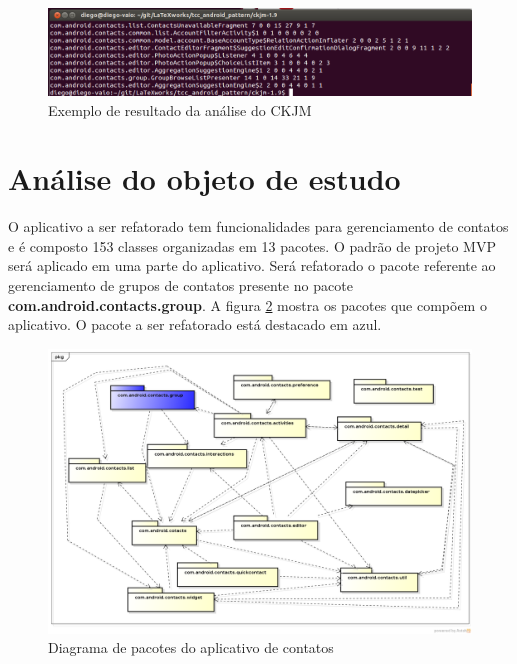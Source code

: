 \begin{figure}[htb]
	\label{fig:ckjm_result}
	\caption{Exemplo de resultado da análise do CKJM} 
	\begin{center}
		\includegraphics[scale=0.45]{img/ckjm_result.png}
	\end{center}
\end{figure}


\section{Análise do objeto de estudo}

O aplicativo a ser refatorado tem funcionalidades para gerenciamento de
contatos e é composto 153 classes organizadas em 13 pacotes. O padrão
de projeto MVP será aplicado em uma parte do aplicativo. Será refatorado o
pacote referente ao gerenciamento de grupos de contatos presente no pacote
\textbf{com.android.contacts.group}. A figura \ref{fig:pacotes_contacts}
mostra os pacotes que compõem o aplicativo. O pacote a ser refatorado está
destacado em azul.

\begin{figure}[htb]
	\label{fig:pacotes_contacts}
	\caption{Diagrama de pacotes do aplicativo de contatos}  
	\begin{center}
		\includegraphics[scale=0.40,angle=90]{img/pacotes_contacts.png}
	\end{center}
\end{figure}

